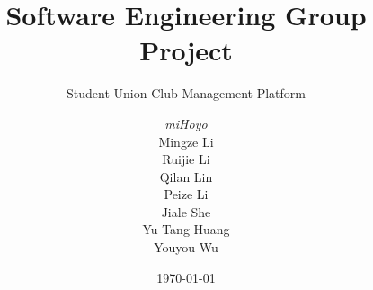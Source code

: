 \documentclass[a4paper, 12pt]{report}
\title{Software Engineering Group Project}
\subtitle{Student Union Club Management Platform}
\author{\textit{miHoyo}\\
Mingze Li\\
Ruijie Li\\
Qilan Lin\\
Peize Li\\
Jiale She\\
Yu-Tang Huang\\
Youyou Wu
}
\date{\today}
\begin{document}
    \maketitle
    \romantableofcontents

    
    
    
    
    
    

    \appendix
\end{document}
